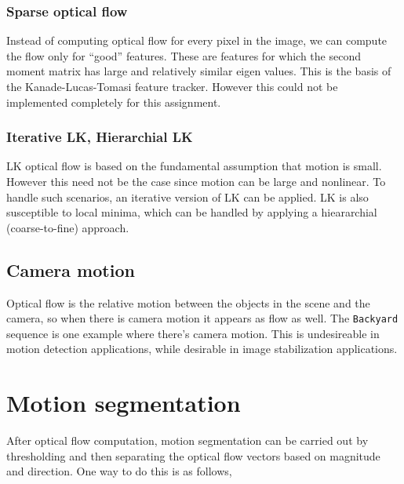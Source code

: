 \documentclass[a4paper,11]{article}
\begin{document}
   \subsubsection*{Sparse optical flow}
   
   Instead of computing optical flow for every pixel in the image, we can compute the flow only for ``good'' features. These are features for which the second moment matrix has large and relatively similar eigen values. This is the basis of the Kanade-Lucas-Tomasi feature tracker. However this could not be implemented completely for this assignment.
   
   \subsubsection*{Iterative LK, Hierarchial LK}
    LK optical flow is based on the fundamental assumption that motion is small. However this need not be the case since motion can be large and nonlinear. To handle such scenarios, an iterative version of LK can be applied. LK is also susceptible to local minima, which can be handled by applying a hieararchial (coarse-to-fine) approach.
   
   \subsection*{Camera motion}
   
   Optical flow is the relative motion between the objects in the scene and the camera, so when there is camera motion it appears as flow as well. The \texttt{Backyard} sequence is one example where there's camera motion. This is undesireable in motion detection applications, while desirable in image stabilization applications.


\section{Motion segmentation}

After optical flow computation, motion segmentation can be carried out by thresholding and then separating the optical flow vectors based on magnitude and direction. One way to do this is as follows,
\end{document}
